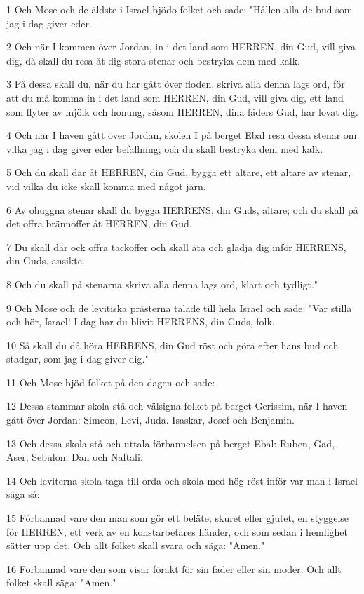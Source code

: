 \par 1 Och Mose och de äldste i Israel bjödo folket och sade: "Hållen alla de bud som jag i dag giver eder.
\par 2 Och när I kommen över Jordan, in i det land som HERREN, din Gud, vill giva dig, då skall du resa åt dig stora stenar och bestryka dem med kalk.
\par 3 På dessa skall du, när du har gått över floden, skriva alla denna lags ord, för att du må komma in i det land som HERREN, din Gud, vill giva dig, ett land som flyter av mjölk och honung, såsom HERREN, dina fäders Gud, har lovat dig.
\par 4 Och när I haven gått över Jordan, skolen I på berget Ebal resa dessa stenar om vilka jag i dag giver eder befallning; och du skall bestryka dem med kalk.
\par 5 Och du skall där åt HERREN, din Gud, bygga ett altare, ett altare av stenar, vid vilka du icke skall komma med något järn.
\par 6 Av ohuggna stenar skall du bygga HERRENS, din Guds, altare; och du skall på det offra brännoffer åt HERREN, din Gud.
\par 7 Du skall där ock offra tackoffer och skall äta och glädja dig inför HERRENS, din Guds. ansikte.
\par 8 Och du skall på stenarna skriva alla denna lags ord, klart och tydligt."
\par 9 Och Mose och de levitiska prästerna talade till hela Israel och sade: "Var stilla och hör, Israel! I dag har du blivit HERRENS, din Guds, folk.
\par 10 Så skall du då höra HERRENS, din Gud röst och göra efter hans bud och stadgar, som jag i dag giver dig."
\par 11 Och Mose bjöd folket på den dagen och sade:
\par 12 Dessa stammar skola stå och välsigna folket på berget Gerissim, när I haven gått över Jordan: Simeon, Levi, Juda. Isaskar, Josef och Benjamin.
\par 13 Och dessa skola stå och uttala förbannelsen på berget Ebal: Ruben, Gad, Aser, Sebulon, Dan och Naftali.
\par 14 Och leviterna skola taga till orda och skola med hög röst inför var man i Israel säga så:
\par 15 Förbannad vare den man som gör ett beläte, skuret eller gjutet, en styggelse för HERREN, ett verk av en konstarbetares händer, och som sedan i hemlighet sätter upp det. Och allt folket skall svara och säga: "Amen."
\par 16 Förbannad vare den som visar förakt för sin fader eller sin moder. Och allt folket skall säga: "Amen."
